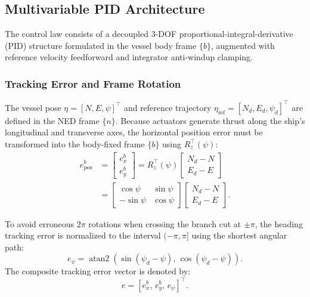 \documentclass[10pt,conference]{IEEEtran}
\begin{document}
\subsection{Multivariable PID Architecture}
The control law consists of a decoupled 3-DOF proportional-integral-derivative (PID) structure formulated in the vessel body frame $\{b\}$, augmented with reference velocity feedforward and integrator anti-windup clamping.

\subsubsection{Tracking Error and Frame Rotation}
The vessel pose $\eta = [N, E, \psi]^\top$ and reference trajectory $\eta_{\mathrm{ref}} = [N_d, E_d, \psi_d]^\top$ are defined in the NED frame $\{n\}$. Because actuators generate thrust along the ship's longitudinal and transverse axes, the horizontal position error must be transformed into the body-fixed frame $\{b\}$ using $R_z^\top(\psi)$:
\begin{align}
e_{\mathrm{pos}}^b &= \begin{bmatrix} e_x^b \\ e_y^b \end{bmatrix} = R_z^\top(\psi) \begin{bmatrix} N_d - N \\ E_d - E \end{bmatrix} \nonumber \\
&= \begin{bmatrix} \cos\psi & \sin\psi \\ -\sin\psi & \cos\psi \end{bmatrix} \begin{bmatrix} N_d - N \\ E_d - E \end{bmatrix}.
\end{align}

To avoid erroneous $2\pi$ rotations when crossing the branch cut at $\pm \pi$, the heading tracking error is normalized to the interval $(-\pi, \pi]$ using the shortest angular path:
\begin{equation}
e_\psi = \operatorname{atan2}\left( \sin(\psi_d - \psi),\, \cos(\psi_d - \psi) \right).
\end{equation}
The composite tracking error vector is denoted by:
\begin{equation}
e = [e_x^b,\, e_y^b,\, e_\psi]^\top.
\end{equation}
\end{document}
